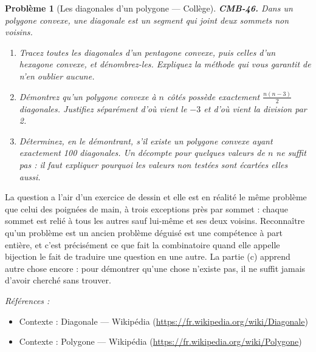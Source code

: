 \documentclass[11pt]{article}
\newtheorem{problem}{Problème}
\newenvironment{refs}{\par\small\noindent\emph{Références :}\begin{itemize}\setlength\itemsep{0pt}}{\end{itemize}\normalsize}
\begin{document}
\bigskip

\begin{problem}[{Les diagonales d'un polygone --- Collège}]
\textbf{CMB-46.} Dans un polygone convexe, une diagonale est un segment qui joint deux sommets
non voisins.
\begin{enumerate}
\item[(a)] Tracez toutes les diagonales d'un pentagone convexe, puis celles d'un hexagone convexe, et
dénombrez-les. Expliquez la méthode qui vous garantit de n'en oublier aucune.
\item[(b)] Démontrez qu'un polygone convexe à $ n $ côtés possède exactement
$ \frac{n(n-3)}{2} $ diagonales. Justifiez séparément d'où vient le $ -3 $ et d'où vient la
division par 2.
\item[(c)] Déterminez, en le démontrant, s'il existe un polygone convexe ayant exactement 100 diagonales.
Un décompte pour quelques valeurs de $ n $ ne suffit pas : il faut expliquer pourquoi les valeurs
non testées sont écartées elles aussi.
\end{enumerate}

\end{problem}

\noindent La question a l'air d'un exercice de dessin et elle est en réalité le même
problème que celui des poignées de main, à trois exceptions près par sommet : chaque sommet est
relié à tous les autres sauf lui-même et ses deux voisins. Reconnaître qu'un problème est un
ancien problème déguisé est une compétence à part entière, et c'est précisément ce que fait la
combinatoire quand elle appelle \og{} bijection \fg{} le fait de traduire une question en une autre. La
partie (c) apprend autre chose encore : pour démontrer qu'une chose n'existe pas, il ne suffit
jamais d'avoir cherché sans trouver.

\begin{refs}
\item Contexte : Diagonale --- Wikipédia (\url{https://fr.wikipedia.org/wiki/Diagonale})
\item Contexte : Polygone --- Wikipédia (\url{https://fr.wikipedia.org/wiki/Polygone})
\end{refs}

\bigskip
\end{document}
